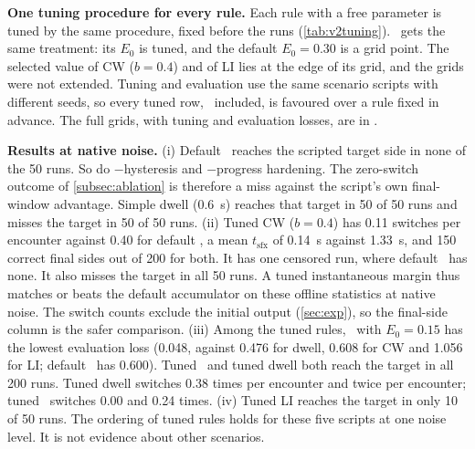 \noindent\textbf{One tuning procedure for every rule.} Each rule with a free parameter is tuned by the same procedure, fixed before the runs (\cref{tab:v2tuning}). \sname\ gets the same treatment: its $E_0$ is tuned, and the default $E_0=0.30$ is a grid point. The selected value of CW ($b=0.4$) and of LI lies at the edge of its grid, and the grids were not extended. Tuning and evaluation use the same scenario scripts with different seeds, so every tuned row, \sname\ included, is favoured over a rule fixed in advance. The full grids, with tuning and evaluation losses, are in .





\noindent\textbf{Results at native noise.} (i) Default \sname\ reaches the scripted target side in none of the 50  runs. So do $-$hysteresis and $-$progress hardening. The zero-switch outcome of \cref{subsec:ablation} is therefore a miss against the script's own final-window advantage. Simple dwell (0.6~s) reaches that target in 50 of 50 runs and misses the  target in 50 of 50 runs. (ii) Tuned CW ($b=0.4$) has 0.11 switches per encounter against 0.40 for default \sname, a mean $t_{\text{sfx}}$ of 0.14~s against 1.33~s, and 150 correct final sides out of 200 for both. It has one censored run, where default \sname\ has none. It also misses the  target in all 50 runs. A tuned instantaneous margin thus matches or beats the default accumulator on these offline statistics at native noise. The switch counts exclude the initial output (\cref{sec:exp}), so the final-side column is the safer comparison. (iii) Among the tuned rules, \sname\ with $E_0=0.15$ has the lowest evaluation loss (0.048, against 0.476 for dwell, 0.608 for CW and 1.056 for LI; default \sname\ has 0.600). Tuned \sname\ and tuned dwell both reach the target in all 200 runs. Tuned dwell switches 0.38 times per  encounter and twice per  encounter; tuned \sname\ switches 0.00 and 0.24 times. (iv) Tuned LI reaches the  target in only 10 of 50 runs. The ordering of tuned rules holds for these five scripts at one noise level. It is not evidence about other scenarios.




